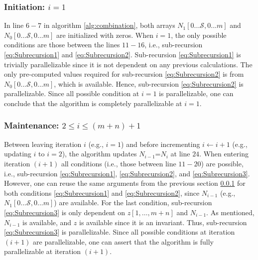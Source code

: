 \documentclass[a4paper,11pt]{article}
\begin{document}
\begin{comment}
\subsubsection{Initiation: $i=0$}
\label{subsubsec:v1}
Recursion \ref{eq:Subrecursion1} (i.e., when $i=0$) is trivially parallelizable since it is not dependent on any previous calculations.
\end{comment}

\subsubsection{Initiation: $i=1$}
\label{subsubsec:v2}
In line $6-7$ in algorithm \ref{alg:combination}, both arrays $N_{1}[0...\mathcal{S},0...m]$ and $N_{0}[0...\mathcal{S},0...m]$ are initialized with zeros. When $i=1$, the only possible conditions are those between the lines $11-16$, i.e., sub-recursion \ref{eq:Subrecursion1} and \ref{eq:Subrecursion2}. Sub-recursion \ref{eq:Subrecursion1} is trivially parallelizable since it is not dependent on any previous calculations. The only pre-computed values required for sub-recursion \ref{eq:Subrecursion2} is from $N_{0}[0...\mathcal{S},0...m]$, which is available. Hence, sub-recursion \ref{eq:Subrecursion2} is parallelizable. Since all possible condition at $i=1$ is parallelizable, one can conclude that the algorithm is completely parallelizable at $i=1$.


\subsubsection{Maintenance: $2\leq i \leq (m+n)+1$}
\label{subsubsec:maintenance}
Between leaving iteration $i$ (e.g., $i=1$) and before incrementing $i\leftarrow i+1$ (e.g., updating $i$ to $i=2$), the algorithm updates $N_{i-1}$=$N_{i}$ at line $24$. When entering iteration $(i+1)$ all conditions (i.e., those between line $11-20$) are possible, i.e., sub-recursion \ref{eq:Subrecursion1}, \ref{eq:Subrecursion2}, and \ref{eq:Subrecursion3}. However, one can reuse the same arguments from the previous section \ref{subsubsec:v2} for both conditions \ref{eq:Subrecursion1} and \ref{eq:Subrecursion2}, since $N_{i-1}$ (e.g., $N_{1}[0...\mathcal{S},0...m]$) are available. For the last condition, sub-recursion \ref{eq:Subrecursion3} is only dependent on $z[1,\ldots,m+n]$ and $N_{i-1}$. As mentioned, $N_{i-1}$ is available, and $z$ is available since it is an invariant. Thus, sub-recursion \ref{eq:Subrecursion3} is parallelizable. Since all possible conditions at iteration $(i+1)$ are parallelizable, one can assert that the algorithm is fully parallelizable at iteration $(i+1)$.
\end{document}
